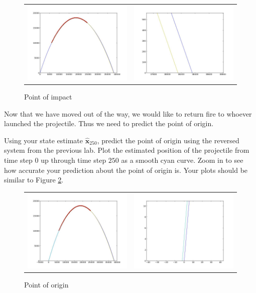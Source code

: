\begin{figure}
	\centering
	\begin{tabular}{cc} 
	\includegraphics[width=.49\textwidth]{problem4_1.jpg} & 
	\includegraphics[width=.49\textwidth]{problem4_2.jpg}
	\end{tabular}
	\caption{Point of impact}
	\label{fig:problem4}
\end{figure}

Now that we have moved out of the way, we would like to return fire to whoever launched the projectile. Thus we need to predict the point of origin.

\begin{problem}
Using your state estimate $\widehat{\mathbf{x}}_{250}$, predict the point of origin using the reversed system from the previous lab. Plot the estimated position of the projectile from time step $0$ up through time step $250$ as a smooth cyan curve. Zoom in to see how accurate your prediction about the point of origin is. Your plots should be similar to Figure \ref{fig:problem5}.
\end{problem}

\begin{figure}
	\centering
	\begin{tabular}{cc} 
	\includegraphics[width=.49\textwidth]{problem5_1.jpg} & 
	\includegraphics[width=.49\textwidth]{problem5_2.jpg}
	\end{tabular}
	\caption{Point of origin}
	\label{fig:problem5}
\end{figure}